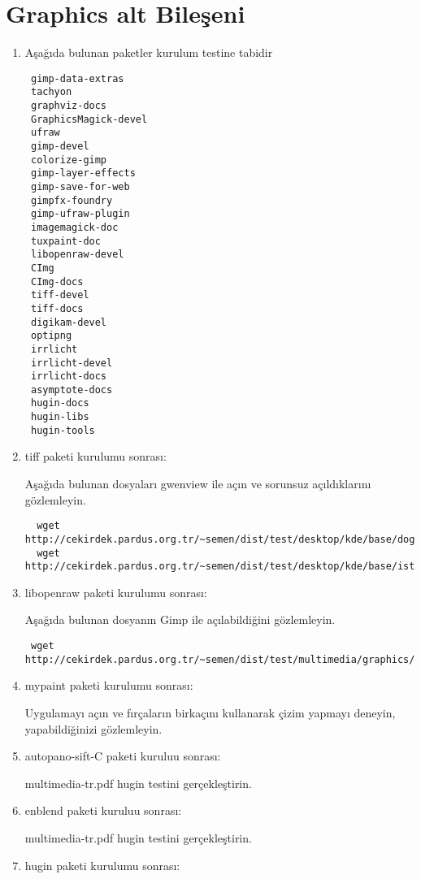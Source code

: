 \documentclass[a4paper,10pt]{article}
\begin{document}
\section{Graphics alt Bileşeni}
\begin{enumerate}
 \item Aşağıda bulunan paketler kurulum testine tabidir
\begin{verbatim}
 gimp-data-extras
 tachyon
 graphviz-docs
 GraphicsMagick-devel
 ufraw
 gimp-devel
 colorize-gimp
 gimp-layer-effects
 gimp-save-for-web
 gimpfx-foundry
 gimp-ufraw-plugin
 imagemagick-doc
 tuxpaint-doc 
 libopenraw-devel
 CImg
 CImg-docs
 tiff-devel
 tiff-docs
 digikam-devel
 optipng
 irrlicht
 irrlicht-devel
 irrlicht-docs
 asymptote-docs
 hugin-docs
 hugin-libs
 hugin-tools
\end{verbatim}

\item tiff paketi kurulumu sonrası:

Aşağıda bulunan dosyaları gwenview ile açın ve sorunsuz açıldıklarını gözlemleyin.
\begin{verbatim}
  wget http://cekirdek.pardus.org.tr/~semen/dist/test/desktop/kde/base/doga.tiff
  wget http://cekirdek.pardus.org.tr/~semen/dist/test/desktop/kde/base/istanbul.tiff
\end{verbatim}

\item libopenraw paketi kurulumu sonrası:

Aşağıda bulunan dosyanın Gimp ile açılabildiğini gözlemleyin.

\begin{verbatim}
 wget http://cekirdek.pardus.org.tr/~semen/dist/test/multimedia/graphics/DSC_0048.NEF
\end{verbatim}


\item mypaint paketi kurulumu sonrası:

Uygulamayı açın ve fırçaların birkaçını kullanarak çizim yapmayı deneyin, yapabildiğinizi gözlemleyin.

\item autopano-sift-C paketi kuruluu sonrası:

multimedia-tr.pdf hugin testini gerçekleştirin.

\item enblend paketi kuruluu sonrası:

multimedia-tr.pdf hugin testini gerçekleştirin.

\item hugin paketi kurulumu sonrası:


\end{enumerate}
\end{document}

